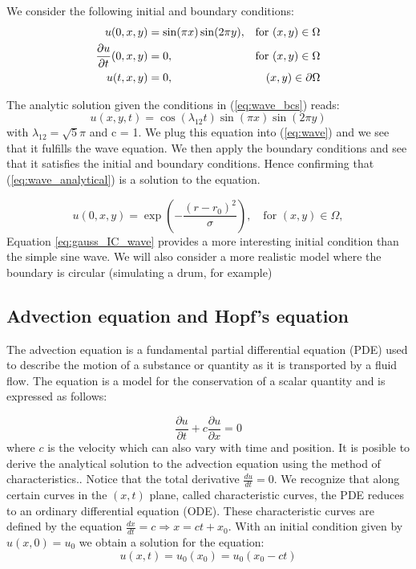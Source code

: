 \documentclass[5p,sort&compress]{elsarticle}
\numberwithin{equation}{subsection}
\begin{document}
We consider the following initial and boundary conditions:
\begin{align}
    u(0, x, y) &= \sin(\pi x) \sin(2\pi y), & \text{for } (x, y) \in \Omega  \notag\\ 
        \frac{\partial u}{\partial t}(0, x, y) &= 0, & \text{for } (x, y) \in \Omega \label{eq:wave_bcs} \\
    u(t, x, y) &= 0, & (x, y) \in \partial\Omega \notag
\end{align}

The analytic solution given the conditions in (\ref{eq:wave_bcs}) reads:
\begin{equation}
    u(x,y,t) = \cos{(\lambda_{12}t)}\sin{(\pi x)}\sin{(2\pi y)}
    \label{eq:wave_analytical}
\end{equation}
with $\lambda_{12} = \sqrt{5}\pi$ and c = 1. \cite{presentation2} We plug this equation into (\ref{eq:wave}) and we see that it fulfills the wave equation. We then apply the boundary conditions and see that it satisfies the initial and boundary conditions. Hence confirming that (\ref{eq:wave_analytical}) is a solution to the equation. 

\begin{equation}
    u(0, x, y) = \exp\left(-\frac{(r - r_0)^2}{\sigma}\right), \quad \text{for } (x,y) \in \Omega,
    \label{eq:gauss_IC_wave}
\end{equation}
Equation \ref{eq:gauss_IC_wave} provides a more interesting initial condition than the simple sine wave. We will also consider a more realistic model where the boundary is circular (simulating a drum, for example) 
\subsection{Advection equation and Hopf's equation}
The advection equation is a fundamental partial differential equation (PDE) used to describe the motion of a substance or quantity as it is transported by a fluid flow. The equation is a model for the conservation of a scalar quantity and is expressed as follows:

\begin{equation}
\frac{\partial u}{\partial t} + c \frac{\partial u}{\partial x} = 0
\label{eq:transport}
\end{equation}
where $c$ is the velocity which can also vary with time and position.
It is posible to derive the analytical solution to the advection equation using the method of characteristics.\cite{characteristics}. Notice that the total derivative $\frac{du}{dt}=0$. We recognize that along certain curves in the $(x,t)$ plane, called characteristic curves, the PDE reduces to an ordinary differential equation (ODE). These characteristic curves are defined by the equation $\frac{dx}{dt} = c \Rightarrow x = ct+x_0$. With an initial condition given by $u(x,0) = u_0$ we obtain a solution for the equation:
\begin{equation}
    u(x,t) = u_0(x_0) = u_0(x_0-ct)
    \label{eq:transport_anal}
\end{equation}
\end{document}
